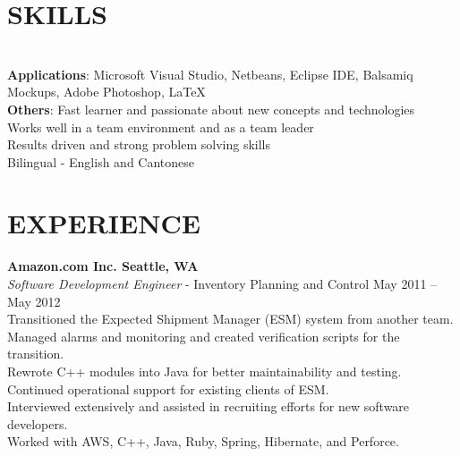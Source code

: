 \documentclass[margin,line]{resume}
\begin{document}
\begin{resume}
    \section{\mysidestyle \textbf{\large{S}\small{KILLS}}}

    \\
    \textbf{Applications}: Microsoft Visual Studio, Netbeans, Eclipse IDE, Balsamiq Mockups, Adobe Photoshop, \LaTeX\\
    \textbf{Others}: Fast learner and passionate about new concepts and technologies\\
      \hspace*{\identsize} Works well in a team environment and as a team leader\\
      \hspace*{\identsize} Results driven and strong problem solving skills\\
      \hspace*{\identsize} Bilingual - English and Cantonese

\sectionline

    \section{\mysidestyle \textbf{\large{E}\small{XPERIENCE}}}

    \textbf{\listing Amazon.com Inc. \hfill Seattle, WA}\\
    \textsl{Software Development Engineer} - Inventory Planning and Control \hfill May 2011 -- May 2012\\
      \hspace*{\identsize} Transitioned the Expected Shipment Manager (ESM) system from another team.\\
      \hspace*{\identsize} Managed alarms and monitoring and created verification scripts for the transition.\\
      \hspace*{\identsize} Rewrote C++ modules into Java for better maintainability and testing.\\
      \hspace*{\identsize} Continued operational support for existing clients of ESM.\\
      \hspace*{\identsize} Interviewed extensively and assisted in recruiting efforts for new software developers.\\
      \hspace*{\identsize} Worked with AWS, C++, Java, Ruby, Spring, Hibernate, and Perforce.
    \vspace{-2mm}


\end{resume}
\end{document}
